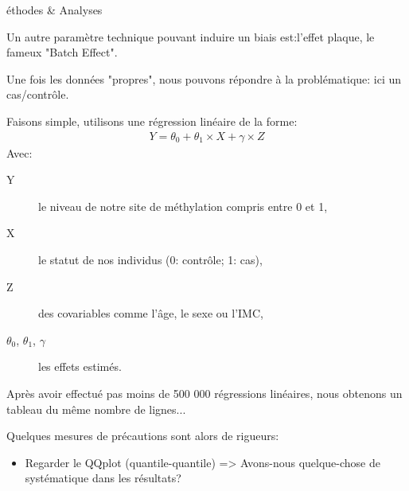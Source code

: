 \begin{frame}[allowframebreaks]{éthodes \& Analyses}
\begin{center}
\end{center}
\framebreak
\par{Un autre paramètre technique pouvant induire un biais est:\newline l'effet plaque, le fameux "Batch Effect".}
\begin{center}
\end{center}
\par{Une fois les données "propres", nous pouvons répondre à la problématique: ici un cas/contrôle.}
\par{Faisons simple, utilisons une régression linéaire de la forme:
\begin{eqnarray}Y = \theta_{0}+\theta_{1}\times X + \gamma \times Z\nonumber\end{eqnarray}
Avec:
\begin{description}
\item[Y] le niveau de notre site de méthylation compris entre 0 et 1,
\item[X] le statut de nos individus (0: contrôle; 1: cas),
\item[Z] des covariables comme l'âge, le sexe ou l'IMC,
\item[$\theta_0$, $\theta_1$, $\gamma$] les effets estimés.
\end{description}
}
\framebreak
\par{Après avoir effectué pas moins de 500 000 régressions linéaires, nous obtenons un tableau du même nombre de lignes...}
\vspace{1cm}
\par{Quelques mesures de précautions sont alors de rigueurs:}
\begin{itemize}
    \item Regarder le QQplot (quantile-quantile) => Avons-nous quelque-chose de systématique dans les résultats?

\end{itemize}
\end{frame}
